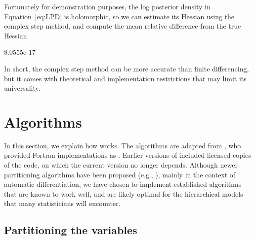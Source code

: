 \documentclass[jss]{jss}\usepackage[]{graphicx}\usepackage[]{color}
\begin{document}
Fortunately for demonstration purposes, the log posterior density in
Equation~\ref{eq:LPD} is holomorphic, so we
can estimate its Hessian using the complex step method, and compute
the mean relative difference from the true Hessian.

\begin{Schunk}
\begin{Soutput}
[1] 8.0555e-17
\end{Soutput}
\end{Schunk}



In short, the complex step method can be more accurate than
finite differencing, but it comes with theoretical and implementation
restrictions that may limit its universality.

\section[Algorithms]{Algorithms}\label{sec:algorithms}

In this section, we explain how  works. The
algorithms are adapted from \citet{ColemanGarbow1985}, who provided
Fortran implementations as \citet{ColemanGarbow1985b}.  Earlier
versions of  included licensed copies of the
\citet{ColemanGarbow1985b} code, on which the current version no
longer depends. Although newer partitioning algorithms have been proposed (e.g.,
\citealp{GebremedhinManne2005,GebremedhinTarafdar2009}), mainly in the
context of automatic differentiation, we have chosen to implement
established algorithms that are known to work well, and are likely
optimal for the hierarchical models that many statisticians will encounter.


\subsection[Partitioning the variables]{Partitioning the variables}\label{sec:coloring}
\end{document}
